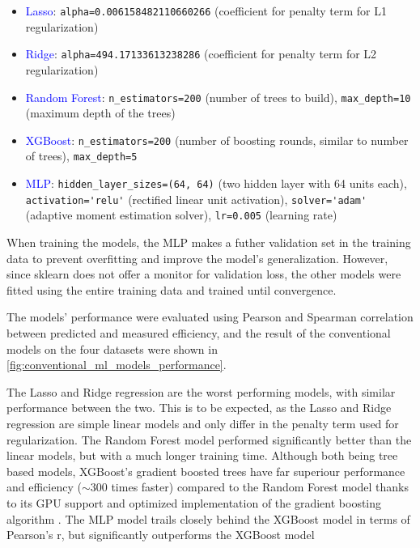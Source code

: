 \begin{itemize}[itemsep=-0mm]
    \item \textcolor{blue}{Lasso}: \verb|alpha=0.006158482110660266| (coefficient for penalty term for L1 regularization)
    \item \textcolor{blue}{Ridge}: \verb|alpha=494.17133613238286| (coefficient for penalty term for L2 regularization)
    \item \textcolor{blue}{Random Forest}: \verb|n_estimators=200| (number of trees to build), \verb|max_depth=10| (maximum depth of the trees)
    \item \textcolor{blue}{XGBoost}: \verb|n_estimators=200| (number of boosting rounds, similar to number of trees), \verb|max_depth=5| 
    \item \textcolor{blue}{MLP}: \verb|hidden_layer_sizes=(64, 64)| (two hidden layer with 64 units each), \verb|activation='relu'| (rectified linear unit activation), \verb|solver='adam'| (adaptive moment estimation solver), \verb|lr=0.005| (learning rate)
\end{itemize}

When training the models, the MLP makes a futher validation set in the training data to prevent overfitting and improve the model's generalization. However, since sklearn does not offer a monitor for validation loss, the other models were fitted using the entire training data and trained until convergence.

The models' performance were evaluated using Pearson and Spearman correlation between predicted and measured efficiency, and the result of the conventional models on the four datasets were shown in \autoref{fig:conventional_ml_models_performance}. 

The Lasso and Ridge regression are the worst performing models, with similar performance between the two. This is to be expected, as the Lasso and Ridge regression are simple linear models and only differ in the penalty term used for regularization. The Random Forest model performed significantly better than the linear models, but with a much longer training time. Although both being tree based models, XGBoost's gradient boosted trees have far superiour performance and efficiency ($\sim$300 times faster) compared to the Random Forest model thanks to its GPU support and optimized implementation of the gradient boosting algorithm . The MLP model trails closely behind the XGBoost model in terms of Pearson's r, but significantly outperforms the XGBoost model 

